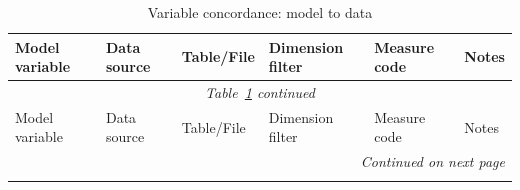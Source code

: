 \documentclass[11pt,a4paper]{article}
\begin{document}
\begin{landscape}
\begin{longtable}{@{}p{2.5cm}p{3cm}p{2cm}p{2.5cm}p{3cm}p{3cm}@{}}
\caption{Variable concordance: model to data}\label{tab:concordance}\\
\toprule
Model variable & Data source & Table/File & Dimension filter & Measure code & Notes \\
\midrule
\endfirsthead
\multicolumn{6}{c}{\textit{Table~\ref{tab:concordance} continued}}\\
\toprule
Model variable & Data source & Table/File & Dimension filter & Measure code & Notes \\
\midrule
\endhead
\midrule
\multicolumn{6}{r}{\textit{Continued on next page}}\\
\endfoot
\bottomrule
\endlastfoot


\end{longtable}
\end{landscape}
\end{document}
